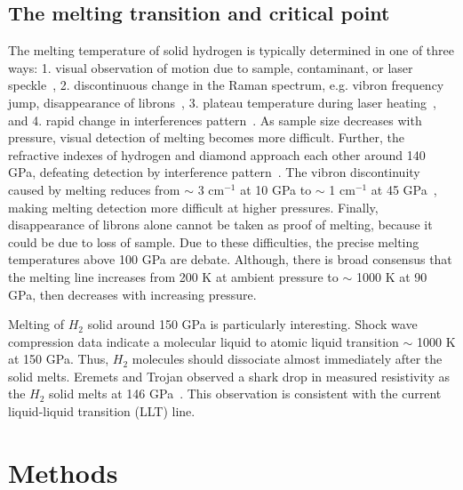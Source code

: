 \subsection{The melting transition and critical point}

The melting temperature of solid hydrogen is typically determined in one of three ways: 1. visual observation of motion due to sample, contaminant, or laser speckle~\cite{Gregoryanz2003}, 2. discontinuous change in the Raman spectrum, e.g. vibron frequency jump, disappearance of librons~\cite{Gregoryanz2003,Subramanian2011,Zha2017}, 3. plateau temperature during laser heating~\cite{Deemyad2008}, and 4. rapid change in interferences pattern~\cite{Eremets2009}.
As sample size decreases with pressure, visual detection of melting becomes more difficult. Further, the refractive indexes of hydrogen and diamond approach each other around 140 GPa, defeating detection by interference pattern~\cite{Zha2017}.
The vibron discontinuity caused by melting reduces from $\sim$ 3 cm$^{-1}$ at 10 GPa to $\sim$ 1 cm$^{-1}$ at 45 GPa~\cite{Gregoryanz2003}, making melting detection more difficult at higher pressures.
Finally, disappearance of librons alone cannot be taken as proof of melting, because it could be due to loss of sample.
Due to these difficulties, the precise melting temperatures above 100 GPa are debate. Although, there is broad consensus that the melting line increases from 200 K at ambient pressure to $\sim$ 1000 K at 90 GPa, then decreases with increasing pressure.

Melting of $H_2$ solid around 150 GPa is particularly interesting. Shock wave compression data indicate a molecular liquid to atomic liquid transition $\sim$ 1000 K at 150 GPa. Thus, $H_2$ molecules should dissociate almost immediately after the solid melts. Eremets and Trojan observed a shark drop in measured resistivity as the $H_2$ solid melts at 146 GPa~\cite{Eremets2009}. This observation is consistent with the current liquid-liquid transition (LLT) line.


\section{Methods}



